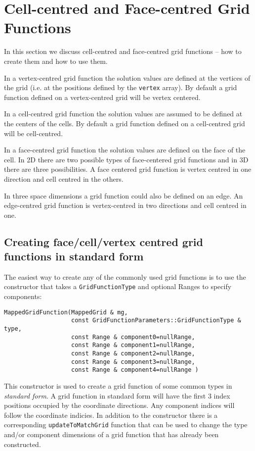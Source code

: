 \section{Cell-centred and Face-centred Grid Functions} \label{sec:cellFace}

  In this section we discuss cell-centred and face-centred
grid functions -- how to create them and how to use them.

In a vertex-centred grid function the solution values are defined
at the vertices of the grid (i.e. at the positions defined by the {\tt vertex} array).
By default a grid function defined on a vertex-centred grid will be vertex centered.

In a cell-centred grid function the solution values are assumed to be defined at
the centers of the cells. 
By default a grid function defined on a cell-centred grid will be cell-centred.

In a face-centred grid function the solution values are defined on the face of the
cell. In 2D there are two possible types of face-centered grid functions and
in 3D there are three possibilities. A face centered grid function is vertex centred
in one direction and cell centred in the others.

In three space dimensions a grid function could also be defined on an edge. An edge-centred
grid function is vertex-centred in two directions and cell centred in one.

\subsection{Creating face/cell/vertex centred grid functions in standard form}

The easiest way to create any of the commonly used grid functions is to use
the constructor that takes a {\tt GridFunctionType} and optional Ranges to specify components:
{\footnotesize
\begin{verbatim}
MappedGridFunction(MappedGrid & mg,
                   const GridFunctionParameters::GridFunctionType & type, 
                   const Range & component0=nullRange,
                   const Range & component1=nullRange,
                   const Range & component2=nullRange,
                   const Range & component3=nullRange,
                   const Range & component4=nullRange )
\end{verbatim}
}
This constructor is used to create a grid function of some common types 
in {\sl standard form}. A grid function in standard form will have the first 3 index positions
occupied by the coordinate directions. Any component indices will follow the coordinate indicies.
In addition to the constructor there is a corresponding
{\tt updateToMatchGrid} function that can be used to change the type and/or component dimensions
of a grid function that has already been constructed.

